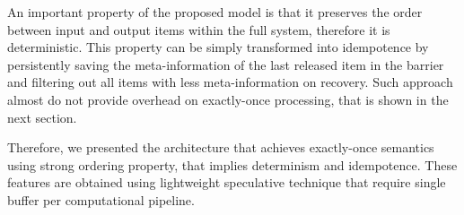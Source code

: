 \label {fs-short-discussion}

An important property of the proposed model is that it preserves the order between input and output items within the full system, therefore it is deterministic. This property can be simply transformed into idempotence by persistently saving the meta-information of the last released item in the barrier and filtering out all items with less meta-information on recovery. Such approach almost do not provide overhead on exactly-once processing, that is shown in the next section. 

Therefore, we presented the architecture that achieves exactly-once semantics using strong ordering property, that implies determinism and idempotence. These features are obtained using lightweight speculative technique that require single buffer per computational pipeline.